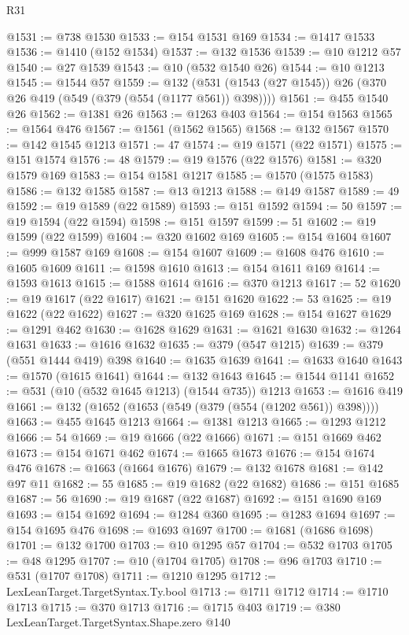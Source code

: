 \begin{lexlean}{R31}
\begin{coremodule}
@1531 := @738 @1530
@1533 := @154 @1531 @169
@1534 := @1417 @1533
@1536 := @1410 (@152 @1534)
@1537 := @132 @1536
@1539 := @10 @1212 @57
@1540 := @27 @1539
@1543 := @10 (@532 @1540 @26)
@1544 := @10 @1213
@1545 := @1544 @57
@1559 := @132 (@531 (@1543 (@27 @1545)) @26 (@370 @26 @419 (@549 (@379 (@554 (@1177 @561)) @398))))
@1561 := @455 @1540 @26
@1562 := @1381 @26
@1563 := @1263 @403
@1564 := @154 @1563
@1565 := @1564 @476
@1567 := @1561 (@1562 @1565)
@1568 := @132 @1567
@1570 := @142 @1545 @1213
@1571 := 47
@1574 := @19 @1571 (@22 @1571)
@1575 := @151 @1574
@1576 := 48
@1579 := @19 @1576 (@22 @1576)
@1581 := @320 @1579 @169
@1583 := @154 @1581 @1217
@1585 := @1570 (@1575 @1583)
@1586 := @132 @1585
@1587 := @13 @1213
@1588 := @149 @1587
@1589 := 49
@1592 := @19 @1589 (@22 @1589)
@1593 := @151 @1592
@1594 := 50
@1597 := @19 @1594 (@22 @1594)
@1598 := @151 @1597
@1599 := 51
@1602 := @19 @1599 (@22 @1599)
@1604 := @320 @1602 @169
@1605 := @154 @1604
@1607 := @999 @1587 @169
@1608 := @154 @1607
@1609 := @1608 @476
@1610 := @1605 @1609
@1611 := @1598 @1610
@1613 := @154 @1611 @169
@1614 := @1593 @1613
@1615 := @1588 @1614
@1616 := @370 @1213
@1617 := 52
@1620 := @19 @1617 (@22 @1617)
@1621 := @151 @1620
@1622 := 53
@1625 := @19 @1622 (@22 @1622)
@1627 := @320 @1625 @169
@1628 := @154 @1627
@1629 := @1291 @462
@1630 := @1628 @1629
@1631 := @1621 @1630
@1632 := @1264 @1631
@1633 := @1616 @1632
@1635 := @379 (@547 @1215)
@1639 := @379 (@551 @1444 @419) @398
@1640 := @1635 @1639
@1641 := @1633 @1640
@1643 := @1570 (@1615 @1641)
@1644 := @132 @1643
@1645 := @1544 @1141
@1652 := @531 (@10 (@532 @1645 @1213) (@1544 @735)) @1213
@1653 := @1616 @419
@1661 := @132 (@1652 (@1653 (@549 (@379 (@554 (@1202 @561)) @398))))
@1663 := @455 @1645 @1213
@1664 := @1381 @1213
@1665 := @1293 @1212
@1666 := 54
@1669 := @19 @1666 (@22 @1666)
@1671 := @151 @1669 @462
@1673 := @154 @1671 @462
@1674 := @1665 @1673
@1676 := @154 @1674 @476
@1678 := @1663 (@1664 @1676)
@1679 := @132 @1678
@1681 := @142 @97 @11
@1682 := 55
@1685 := @19 @1682 (@22 @1682)
@1686 := @151 @1685
@1687 := 56
@1690 := @19 @1687 (@22 @1687)
@1692 := @151 @1690 @169
@1693 := @154 @1692
@1694 := @1284 @360
@1695 := @1283 @1694
@1697 := @154 @1695 @476
@1698 := @1693 @1697
@1700 := @1681 (@1686 @1698)
@1701 := @132 @1700
@1703 := @10 @1295 @57
@1704 := @532 @1703
@1705 := @48 @1295
@1707 := @10 (@1704 @1705)
@1708 := @96 @1703
@1710 := @531 (@1707 @1708)
@1711 := @1210 @1295
@1712 := LexLeanTarget.TargetSyntax.Ty.bool
@1713 := @1711 @1712
@1714 := @1710 @1713
@1715 := @370 @1713
@1716 := @1715 @403
@1719 := @380 LexLeanTarget.TargetSyntax.Shape.zero @140

\end{coremodule}
\end{lexlean}
